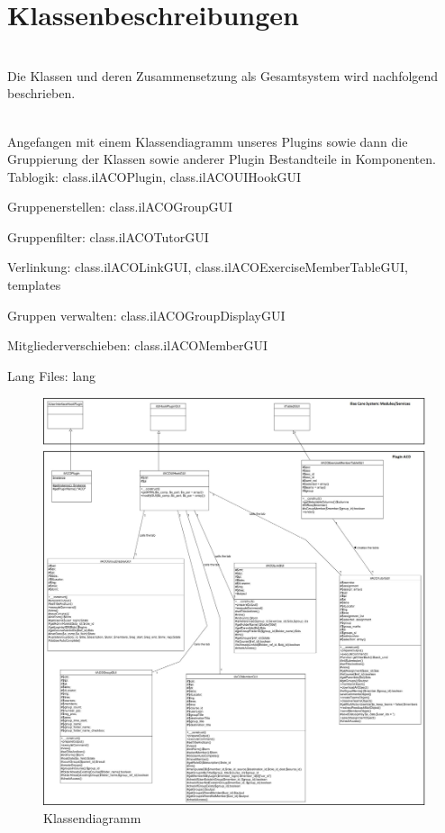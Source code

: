\chapter{Klassenbeschreibungen}
\minitoc


~\\Die Klassen und deren Zusammensetzung als Gesamtsystem wird
nachfolgend beschrieben. 

~\\Angefangen mit einem Klassendiagramm unseres Plugins sowie 
dann die Gruppierung der Klassen sowie anderer Plugin Bestandteile in
Komponenten.		
\\

Tablogik: class.ilACOPlugin, class.ilACOUIHookGUI 

Gruppenerstellen: class.ilACOGroupGUI

Gruppenfilter: class.ilACOTutorGUI

Verlinkung: class.ilACOLinkGUI, class.ilACOExerciseMemberTableGUI, templates

Gruppen verwalten: class.ilACOGroupDisplayGUI

Mitgliederverschieben: class.ilACOMemberGUI

Lang Files: lang


\begin{figure}
	\centering
	\includegraphics[width=1\textwidth]{img/klassendiagramm.jpg}
	\caption{Klassendiagramm}
\end{figure}

